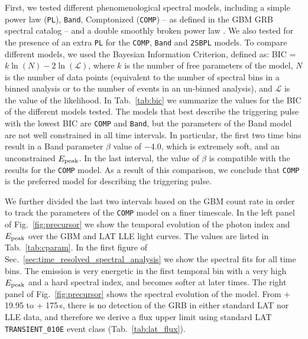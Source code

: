 \documentclass[preprint]{aastex631}
\begin{document}
First, we tested different phenomenological spectral models, including a simple power law (\texttt{PL}), \texttt{Band}, Comptonized (\texttt{COMP}) -- as defined in the GBM GRB spectral catalog \citep{Poolakkil_2021} -- and a double smoothly broken power law \citep[\texttt{2SBPL},][]{2018A&A...613A..16R}. 
We also tested for the presence of an extra \texttt{PL} for the \texttt{COMP}, \texttt{Band} and \texttt{2SBPL} models. To compare different models, we used the Bayesian Information Criterion, defined as: BIC = $k\ln(N)-2\ln(\mathcal{L})$, where $k$ is the number of free parameters of the model, $N$ is the number of data points (equivalent to the number of spectral bins in a binned analysis or to the number of events in an un-binned analysis), and $\mathcal{L}$ is the value of the likelihood. In Tab.~\ref{tab:bic} we summarize the values for the BIC of the different models tested. The models that best describe the triggering pulse with the lowest BIC are \texttt{COMP} and \texttt{Band}, but the parameters of the Band model are not well constrained in all time intervals. 
In particular, the first two time bins result in a Band parameter $\beta$ value of $-4.0$, which is extremely soft, and an unconstrained $E_{\rm peak}$. In the last interval, the value of $\beta$ is compatible with the results for the \texttt{COMP} model. As a result of this comparison, we conclude that \texttt{COMP} is the preferred model for describing the triggering pulse.

We further divided the last two intervals based on the GBM count rate in order to track the parameters of the \texttt{COMP} model on a finer timescale. In the left panel of Fig.~\ref{fig:precursor} we show the temporal evolution of the photon index and $E_{\rm peak}$ over the GBM and LAT LLE light curves. The values are listed in Tab.~\ref{tab:cparam}. In the first figure
of Sec.~\ref{sec:time_resolved_spectral_analysis} we show the spectral fits for all time bins. The emission is very energetic in the first temporal bin with a very high $E_{\rm peak}$ and a hard spectral index, and becomes softer at later times. The right panel of Fig.~\ref{fig:precursor} shows the spectral evolution of the model. From \trig+ 19.95 to \trig+ 175\,s, there is no detection of the GRB in either standard LAT nor LLE data, and therefore we derive a flux upper limit using standard LAT \texttt{TRANSIENT\_010E} event class (Tab.~\ref{tab:lat_flux}).
\end{document}
